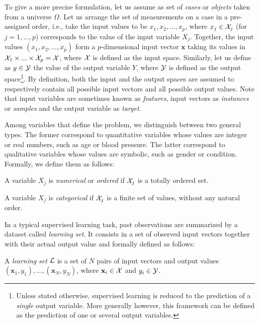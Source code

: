 To give a more precise formulation, let us assume as set of \textit{cases} or
\textit{objects} taken from a universe $\Omega$. Let us arrange the set of
measurements on a case in a pre-assigned order, i.e., take the input values to
be $x_1, x_2, ..., x_p$, where $x_j \in {\cal X}_j$ (for $j = 1, ..., p$)
corresponds to the value of the input variable $X_j$. Together, the input
values $(x_1, x_2, ..., x_p)$ form a $p$-dimensional input vector $\mathbf{x}$
taking its values in ${\cal X}_1 \times ... \times {\cal X}_p = {\cal X}$,
where ${\cal X}$ is defined as the input space. Similarly, let us define as $y
\in {\cal Y}$ the value of the output variable $Y$, where ${\cal Y}$ is defined
as the output space\footnote{Unless stated otherwise, supervised learning is
reduced to the prediction of a \textit{single} output variable. More generally
however, this framework can be defined as the prediction of one or several
output variables.}. By definition, both the input and the output spaces are
assumed to respectively contain all possible input vectors and all possible
output values. Note that input variables are sometimes known as {\it features},
input vectors as {\it instances} or {\it samples} and the output variable as
{\it target}.

Among variables that define the problem, we distinguish between two general
types. The former correspond to quantitative variables whose values are integer
or real numbers, such as age or blood pressure. The latter correspond to
qualitative variables whose values are symbolic, such as gender or condition.
Formally, we define them as follows:

\begin{definition}
A variable $X_j$ is \emph{numerical} or \emph{ordered} if ${\cal X}_j$ is a
totally ordered set.
\end{definition}

\begin{definition}
A variable $X_j$ is \emph{categorical} if ${\cal X}_j$ is a finite set of values,
without any natural order.
\end{definition}

In a typical supervised learning task, past observations are summarized by a
dataset called {\it learning set}. It consists in a set of observed input
vectors together with their actual output value and formally defined as
follows:

\begin{definition}
A \emph{learning set} ${\cal L}$ is a set of $N$
pairs of input vectors and output values $(\mathbf{x}_1, y_1), ...,
(\mathbf{x}_N, y_N)$, where $\mathbf{x}_i \in {\cal X}$ and $y_i \in {\cal Y}$.
\end{definition}

